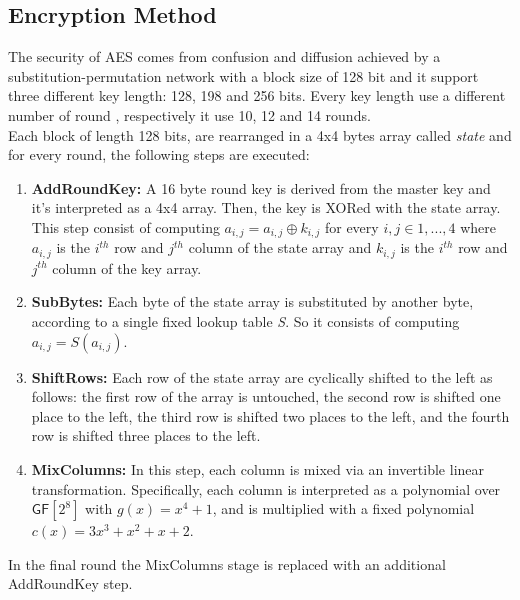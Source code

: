 \subsection{Encryption Method}
The security of AES comes from confusion and diffusion achieved by a substitution-permutation network with a block size of 128 bit and it support three different key length: 128, 198 and 256 bits. Every key length use a different number of round , respectively it use 10, 12 and 14 rounds.\\
Each block of length 128 bits, are rearranged in a 4x4 bytes array called \emph{state} and for every round, the following steps are executed:
\begin{enumerate}
    \item{\textbf{AddRoundKey:} A 16 byte round key is derived from the master key and it's interpreted as a 4x4 array. Then, the key is XORed with the state array.\\This step consist of computing $a_{i,j} = a_{i,j} \oplus k_{i,j}$ for every $i,j \in {1,...,4}$ where $a_{i,j}$ is the $i^{th}$ row and $j^{th}$ column of the state array and $k_{i,j}$ is the $i^{th}$ row and $j^{th}$ column of the key array.}
    \item{\textbf{SubBytes:} Each byte of the state array is substituted by another byte, according to a single fixed lookup table \emph{S}. So it consists of computing $a_{i,j} = S(a_{i,j})$.}
    \item{\textbf{ShiftRows:} Each row of the state array are cyclically shifted to the left as follows: the first row of the array is untouched, the second row is shifted one place to the left, the third row is shifted two places to the left, and the fourth row is shifted three places to the left.}
    \item{\textbf{MixColumns:} In this step, each column is mixed via an invertible linear transformation. Specifically, each column is interpreted as a polynomial over $\mathsf{GF}[2^8]$ with $g(x) = x^4 + 1$, and is multiplied with a fixed polynomial $c(x) = 3x^3 + x^2 + x + 2$.}
\end{enumerate}
In the final round the MixColumns stage is replaced with an additional AddRoundKey step.

